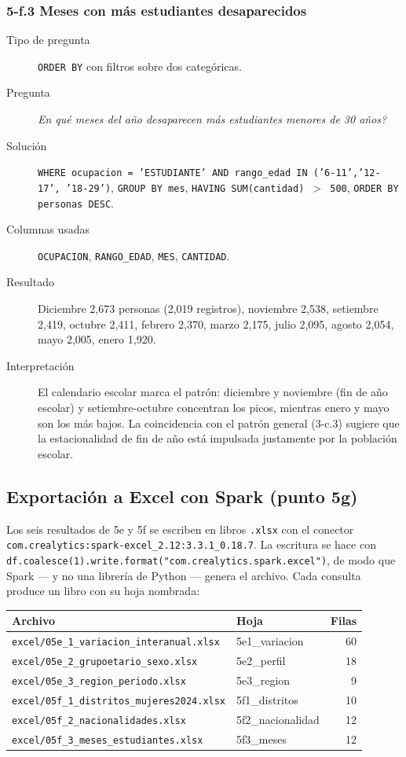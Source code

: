 \subsubsection*{5-f.3 \textbar{} Meses con m\'as estudiantes desaparecidos}
\begin{description}
\item[Tipo de pregunta] \texttt{ORDER BY} con filtros sobre dos categ\'oricas.
\item[Pregunta] \emph{En qu\'e meses del a\~no desaparecen m\'as estudiantes menores de 30
      a\~nos?}
\item[Soluci\'on] \texttt{WHERE ocupacion = 'ESTUDIANTE' AND rango\_edad IN ('6-11','12-17',
      '18-29')}, \texttt{GROUP BY mes}, \texttt{HAVING SUM(cantidad) $>$ 500},
      \texttt{ORDER BY personas DESC}.
\item[Columnas usadas] \texttt{OCUPACION}, \texttt{RANGO\_EDAD}, \texttt{MES},
      \texttt{CANTIDAD}.
\item[Resultado] Diciembre 2,673 personas (2,019 registros), noviembre 2,538, setiembre 2,419,
      octubre 2,411, febrero 2,370, marzo 2,175, julio 2,095, agosto 2,054, mayo 2,005, enero
      1,920.
\item[Interpretaci\'on] El calendario escolar marca el patr\'on: diciembre y noviembre (fin de
      a\~no escolar) y setiembre-octubre concentran los picos, mientras enero y mayo son los
      m\'as bajos. La coincidencia con el patr\'on general (3-c.3) sugiere que la estacionalidad
      de fin de a\~no est\'a impulsada justamente por la poblaci\'on escolar.
\end{description}

\subsection{Exportaci\'on a Excel con Spark (punto 5g)}
Los seis resultados de 5e y 5f se escriben en libros \texttt{.xlsx} con el conector
\texttt{com.crealytics:spark-excel\_2.12:3.3.1\_0.18.7}. La escritura se hace con
\texttt{df.coalesce(1).write.format("com.crealytics.spark.excel")}, de modo que Spark --- y no
una librer\'ia de Python --- genera el archivo. Cada consulta produce un libro con su hoja
nombrada:

\begin{center}
\begin{tabular}{llr}
\toprule
Archivo & Hoja & Filas\\
\midrule
\texttt{excel/05e\_1\_variacion\_interanual.xlsx} & 5e1\_variacion & 60\\
\texttt{excel/05e\_2\_grupoetario\_sexo.xlsx} & 5e2\_perfil & 18\\
\texttt{excel/05e\_3\_region\_periodo.xlsx} & 5e3\_region & 9\\
\texttt{excel/05f\_1\_distritos\_mujeres2024.xlsx} & 5f1\_distritos & 10\\
\texttt{excel/05f\_2\_nacionalidades.xlsx} & 5f2\_nacionalidad & 12\\
\texttt{excel/05f\_3\_meses\_estudiantes.xlsx} & 5f3\_meses & 12\\
\bottomrule
\end{tabular}
\end{center}

